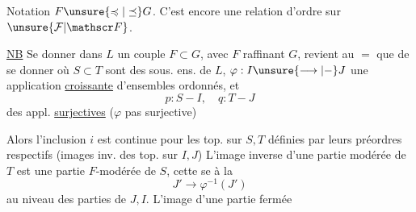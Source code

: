 Notation $F\unsure{\preccurlyeq|\preceq}G$. C'est encore une relation d'ordre sur $\unsure{\mathcal F|\mathscr F}$.

\uline{NB} Se donner dans $L$ un couple $F\subset G$, avec $F$ raffinant $G$, revient au $=$ que de se donner
où $S\subset T$ sont des sous. ens. de $L$, $\varphi:I\unsure{\longrightarrow|-}J$ une application \uline{croissante} d'ensembles ordonnés, et 
\[p:S-I,\quad q:T-J\]
des appl. \uline{surjectives} ($\varphi$ pas  surjective)

Alors l'inclusion $i$ est continue pour les top.  sur $S,T$ définies par leurs préordres respectifs (images inv. des top. sur $I,J$) L'image inverse d'une partie modérée de $T$ est une partie $F$-modérée de $S$, cette  se  à la 
\[J'\longrightarrow\varphi^{-1}(J')\]
au niveau des parties de $J,I$. L'image  d'une partie fermée
